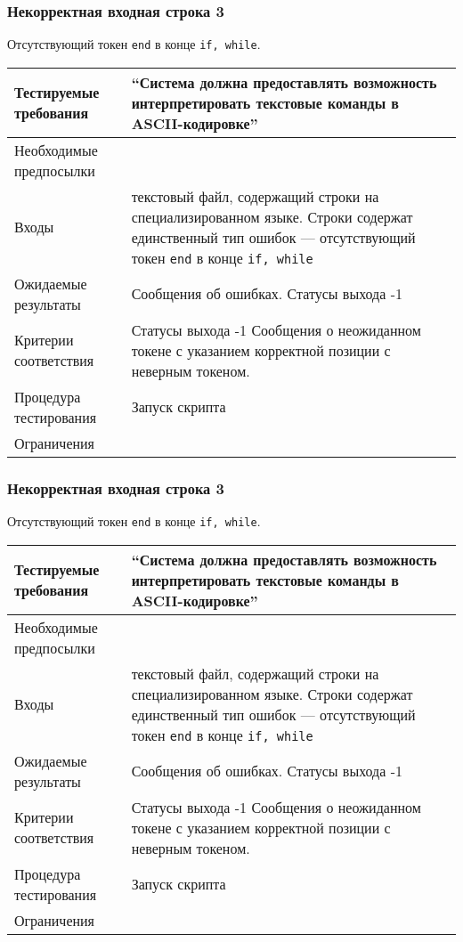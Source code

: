 \documentclass[a4paper, 12pt]{article}
\begin{document}
	\subsubsection{Некорректная входная строка 3} %
	Отсутствующий токен {\tt end} в конце {\tt if, while}.

	\begin{table}[H]
		\centering
		\begin{tabular}{|l|p{4in}|}
			\hline
			Тестируемые требования	&``Система должна предоставлять возможность интерпретировать текстовые
			команды в ASCII-кодировке''\\
			\hline
			Необходимые предпосылки	&\\
			\hline
			Входы			&текстовый файл, содержащий строки на специализированном языке.\newline
			Строки содержат единственный тип ошибок --- 
			отсутствующий токен {\tt end} в конце {\tt if, while}\\
			\hline
			Ожидаемые результаты	&Сообщения об ошибках. Статусы выхода -1\\
			\hline
			Критерии соответствия	&Статусы выхода -1\newline
			Сообщения о неожиданном токене с указанием корректной позиции 
			с неверным токеном.\\
			\hline
			Процедура тестирования	&Запуск скрипта\\
			\hline
			Ограничения		&\\
			\hline
		\end{tabular}
	\end{table}

\subsubsection{Некорректная входная строка 3} %
Отсутствующий токен {\tt end} в конце {\tt if, while}.

	\begin{table}[H]
		\centering
		\begin{tabular}{|l|p{4in}|}
			\hline
			Тестируемые требования	&``Система должна предоставлять возможность интерпретировать текстовые
			команды в ASCII-кодировке''\\
			\hline
			Необходимые предпосылки	&\\
			\hline
			Входы			&текстовый файл, содержащий строки на специализированном языке.\newline
			Строки содержат единственный тип ошибок --- 
			отсутствующий токен {\tt end} в конце {\tt if, while}\\
			\hline
			Ожидаемые результаты	&Сообщения об ошибках. Статусы выхода -1\\
			\hline
			Критерии соответствия	&Статусы выхода -1\newline
			Сообщения о неожиданном токене с указанием корректной позиции с неверным токеном.\\
			\hline
			Процедура тестирования	&Запуск скрипта\\
			\hline
			Ограничения		&\\
			\hline
		\end{tabular}
	\end{table}
\end{document}
